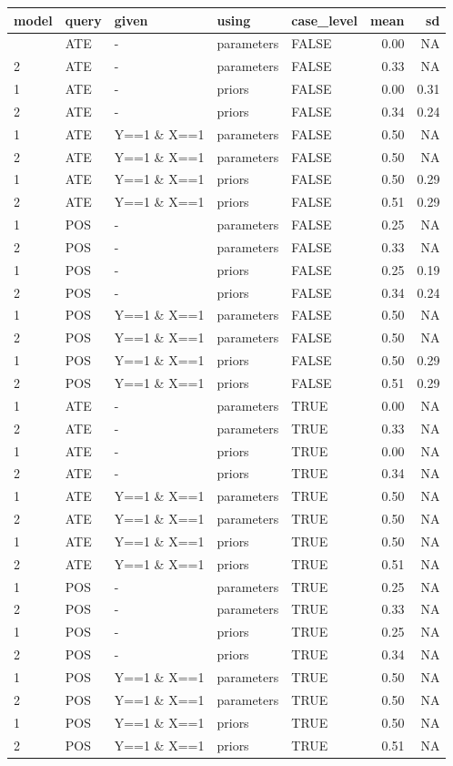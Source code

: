 \documentclass[
  article]{jss}
\begin{document}
\begin{longtable}[]{@{}lllllrr@{}}
\toprule\noalign{}
model & query & given & using & case\_level & mean & sd \\
\midrule\noalign{}
\endhead
\bottomrule\noalign{}
\endlastfoot
1 & ATE & - & parameters & FALSE & 0.00 & NA \\
2 & ATE & - & parameters & FALSE & 0.33 & NA \\
1 & ATE & - & priors & FALSE & 0.00 & 0.31 \\
2 & ATE & - & priors & FALSE & 0.34 & 0.24 \\
1 & ATE & Y==1 \& X==1 & parameters & FALSE & 0.50 & NA \\
2 & ATE & Y==1 \& X==1 & parameters & FALSE & 0.50 & NA \\
1 & ATE & Y==1 \& X==1 & priors & FALSE & 0.50 & 0.29 \\
2 & ATE & Y==1 \& X==1 & priors & FALSE & 0.51 & 0.29 \\
1 & POS & - & parameters & FALSE & 0.25 & NA \\
2 & POS & - & parameters & FALSE & 0.33 & NA \\
1 & POS & - & priors & FALSE & 0.25 & 0.19 \\
2 & POS & - & priors & FALSE & 0.34 & 0.24 \\
1 & POS & Y==1 \& X==1 & parameters & FALSE & 0.50 & NA \\
2 & POS & Y==1 \& X==1 & parameters & FALSE & 0.50 & NA \\
1 & POS & Y==1 \& X==1 & priors & FALSE & 0.50 & 0.29 \\
2 & POS & Y==1 \& X==1 & priors & FALSE & 0.51 & 0.29 \\
1 & ATE & - & parameters & TRUE & 0.00 & NA \\
2 & ATE & - & parameters & TRUE & 0.33 & NA \\
1 & ATE & - & priors & TRUE & 0.00 & NA \\
2 & ATE & - & priors & TRUE & 0.34 & NA \\
1 & ATE & Y==1 \& X==1 & parameters & TRUE & 0.50 & NA \\
2 & ATE & Y==1 \& X==1 & parameters & TRUE & 0.50 & NA \\
1 & ATE & Y==1 \& X==1 & priors & TRUE & 0.50 & NA \\
2 & ATE & Y==1 \& X==1 & priors & TRUE & 0.51 & NA \\
1 & POS & - & parameters & TRUE & 0.25 & NA \\
2 & POS & - & parameters & TRUE & 0.33 & NA \\
1 & POS & - & priors & TRUE & 0.25 & NA \\
2 & POS & - & priors & TRUE & 0.34 & NA \\
1 & POS & Y==1 \& X==1 & parameters & TRUE & 0.50 & NA \\
2 & POS & Y==1 \& X==1 & parameters & TRUE & 0.50 & NA \\
1 & POS & Y==1 \& X==1 & priors & TRUE & 0.50 & NA \\
2 & POS & Y==1 \& X==1 & priors & TRUE & 0.51 & NA \\
\end{longtable}
\end{document}
